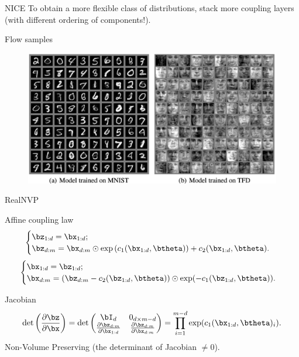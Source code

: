 \begin{frame}{NICE}
	To obtain a more flexible class of distributions, stack more coupling layers (with different ordering of components!). \\
	\begin{block}{Flow samples}
		\begin{figure}
			\centering
			\includegraphics[width=\linewidth]{figs/nice_results.png}
		\end{figure}
	\end{block}
\end{frame}
\begin{frame}{RealNVP}
	\begin{block}{Affine coupling law}
		\[
		\begin{cases} \bz_{1:d} = \bx_{1:d}; \\ \bz_{d:m} = \bx_{d:m} \odot \exp \left(c_1(\bx_{1:d}, \btheta)\right) + c_2(\bx_{1:d}, \btheta).\end{cases} 
		\]
		\[
		\begin{cases} \bx_{1:d} = \bz_{1:d}; \\ \bx_{d:m} = \left(\bz_{d:m} - c_2(\bz_{1:d}, \btheta) \right) \odot \exp(-c_1(\bz_{1:d}, \btheta)).\end{cases}
		\]
	\end{block}
	\begin{block}{Jacobian}
		\vspace{-0.3cm}
		\[
		\det \left( \frac{\partial \bz}{\partial \bx} \right) = \det 
		\begin{pmatrix}
			\bI_d & 0_{d \times m - d} \\
			\frac{\partial \bz_{d:m}}{\partial \bx_{1:d}} & \frac{\partial \bz_{d:m}}{\partial \bx_{d:m}}
		\end{pmatrix} = \prod_{i=1}^{m - d} \exp (c_1(\bx_{1:d}, \btheta)_i).
		\]
		Non-Volume Preserving (the determinant of Jacobian $\neq 0$).
	\end{block}
	
\end{frame}
